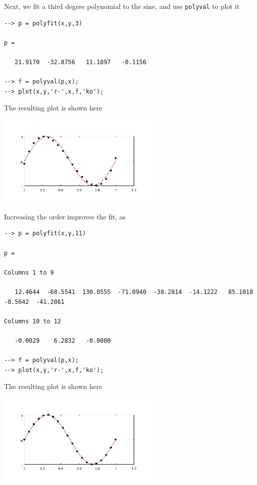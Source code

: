 Next, we fit a third degree polynomial to the sine, and use
\verb|polyval| to plot it
\begin{verbatim}
--> p = polyfit(x,y,3)

p = 

   21.9170  -32.8756   11.1897   -0.1156 

--> f = polyval(p,x);
--> plot(x,y,'r-',x,f,'ko');
\end{verbatim}
The resulting plot is shown here


\centerline{\includegraphics[width=8cm]{polyfit2}}

Increasing the order improves the fit, as
\begin{verbatim}
--> p = polyfit(x,y,11)

p = 
 
Columns 1 to 9

   12.4644  -68.5541  130.0555  -71.0940  -38.2814  -14.1222   85.1018   -0.5642  -41.2861 
 
Columns 10 to 12

   -0.0029    6.2832   -0.0000 

--> f = polyval(p,x);
--> plot(x,y,'r-',x,f,'ko');
\end{verbatim}
The resulting plot is shown here


\centerline{\includegraphics[width=8cm]{polyfit3}}

